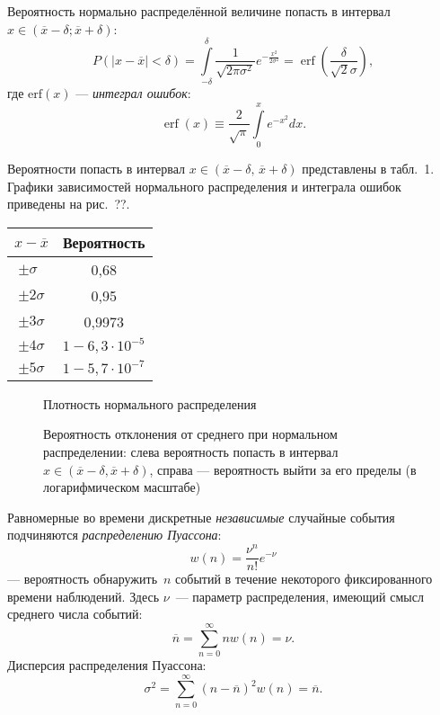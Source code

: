 \begin{labsupplement}
Вероятность нормально распределённой величине попасть в интервал
$x\in (\overline{x}-\delta; \overline{x}+\delta)$:
\[
P({|x-\overline{x}|<\delta})  = 
\int\limits_{-\delta}^{\delta} \frac{1}{\sqrt{2\pi \sigma^2}} e^{-\frac{x^2}{2\sigma^2}} = 
\mathop{\mathrm{erf}}\left(\frac{\delta}{\sqrt{2}\sigma}\right),
\]
где $\mathrm{erf}(x)$ --- \emph{интеграл ошибок}:
\[
\mathop{\mathrm{erf}} (x) \equiv \frac{2}{\sqrt{\pi}} \int\limits_0^x e^{-x^2} dx.
\]

Вероятности попасть в интервал $x\in(\overline{x}-\delta,\,\overline{x}+\delta)$ 
представлены в табл.~1.
Графики зависимостей нормального распределения и интеграла ошибок
приведены на рис.~??.
\begin{table}[h!]\centering
    \small
    \begin{tabular}{cc}
        $x-\overline{x}$ & Вероятность \\ \hline
        $\pm \sigma\phantom{0}$ & 0,68 \\
        $\pm 2\sigma$ & 0,95 \\
        $\pm 3\sigma$ & 0,9973 \\
        $\pm 4\sigma$ & $1-6,3\cdot 10^{-5}$ \\
        $\pm 5\sigma$ & $1-5,7\cdot 10^{-7}$ \\
    \end{tabular}
\end{table}    

\begin{figure}\centering
    \caption{Плотность нормального распределения}
\end{figure}

\begin{figure}\centering\small
    \caption{Вероятность отклонения  от среднего при нормальном распределении: 
    слева вероятность попасть в интервал $x\in(\overline{x}-\delta,\overline{x}+\delta)$, справа ---
     вероятность выйти за его пределы (в логарифмическом масштабе)}
\end{figure}

Равномерные во времени дискретные \emph{независимые} случайные события 
подчиняются \emph{распределению Пуассона}:
\[
w(n) = \frac{\nu^n}{n!}e^{-\nu}
\]
--- вероятность обнаружить~$n$ событий в течение некоторого
фиксированного времени наблюдений. Здесь $\nu$~--- параметр распределения,
имеющий смысл среднего числа событий:
\[
\overline{n} = \sum\limits_{n=0}^{\infty} n w(n) = \nu.
\]
Дисперсия распределения Пуассона:
\[
\sigma^2 = \sum\limits_{n=0}^{\infty} (n-\overline{n})^2 w(n) = \overline{n}.
\]


\end{labsupplement}
